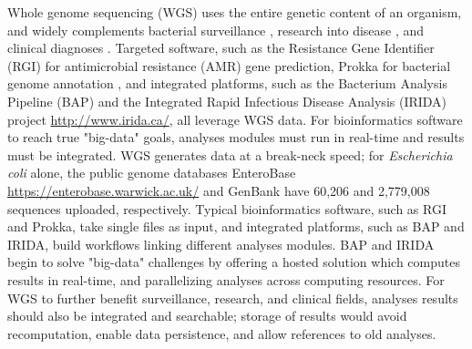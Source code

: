 \documentclass[a4,center,fleqn]{NAR}
\begin{document}
Whole genome sequencing (WGS) uses the entire genetic content of an organism, and widely complements bacterial surveillance \cite{ronholm2016navigating,lytsy2017time}, research into disease \cite{wang2014whole,yuen2015whole}, and clinical diagnoses \cite{willig2015whole,dewey2014clinical}.
Targeted software, such as the Resistance Gene Identifier (RGI) \cite{mcarthur2013comprehensive} for antimicrobial resistance (AMR) gene prediction, Prokka for bacterial genome annotation \cite{doi:10.1093/bioinformatics/btu153}, and integrated platforms, such as the Bacterium Analysis Pipeline (BAP) \cite{thomsen2016bacterial} and the Integrated Rapid Infectious Disease Analysis (IRIDA) project \url{http://www.irida.ca/}, all leverage WGS data.
For bioinformatics software to reach true "big-data" goals, analyses modules must run in real-time and results must be integrated.
WGS generates data at a break-neck speed; for \textit{Escherichia coli} alone, the public genome databases EnteroBase \url{https://enterobase.warwick.ac.uk/} and GenBank \cite{doi:10.1093/nar/gks1195} have 60,206 and 2,779,008 sequences uploaded, respectively.
Typical bioinformatics software, such as RGI and Prokka, take single files as input, and integrated platforms, such as BAP and IRIDA, build workflows linking different analyses modules.
BAP and IRIDA begin to solve "big-data" challenges by offering a hosted solution which computes results in real-time, and parallelizing analyses across computing resources.
For WGS to further benefit surveillance, research, and clinical fields, analyses results should also be integrated and searchable; storage of results would avoid recomputation, enable data persistence, and allow references to old analyses. \par
\end{document}
